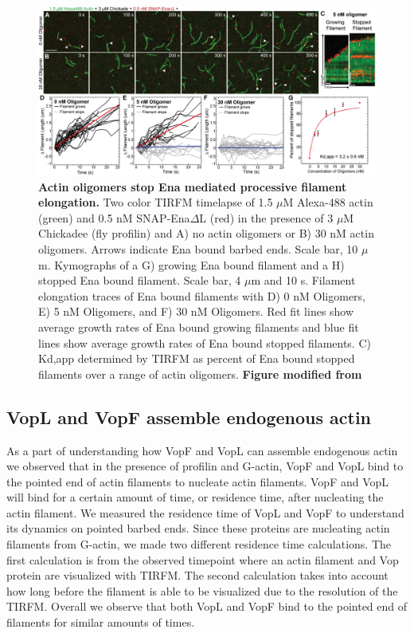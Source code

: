 \begin{figure}
\centering
\includegraphics[width=\textwidth]{img/ch04/Oligomer_Ena_Figure.jpg}
\caption[Actin oligomers stop Ena mediated processive filament elongation.]{\textbf{Actin oligomers stop Ena mediated processive filament elongation.} Two color TIRFM timelapse of 1.5 $\mu$M Alexa-488 actin (green) and 0.5 nM SNAP-Ena$\Delta$L (red) in the presence of 3 $\mu$M Chickadee (fly profilin) and A) no actin oligomers or B) 30 nM actin oligomers. Arrows indicate Ena bound barbed ends. Scale bar, 10 $\mu$m. Kymographs of a G) growing Ena bound filament and a H) stopped Ena bound filament. Scale bar, 4 $\mu$m and 10 s. Filament elongation traces of Ena bound filaments with D) 0 nM Oligomers, E) 5 nM Oligomers, and F) 30 nM Oligomers. Red fit lines show average growth rates of Ena bound growing filaments and blue fit lines show average growth rates of Ena bound stopped filaments. C) Kd,app determined by TIRFM as percent of Ena bound stopped filaments over a range of actin oligomers. \textbf{Figure modified from \citep{kudryashova_actin_2018}}}
\label{fig:ena-oligomers}
\end{figure}

\subsection{VopL and VopF assemble endogenous actin}\label{vops}

As a part of understanding how VopF and VopL can assemble endogenous actin we observed that in the presence of profilin and G-actin, VopF and VopL bind to the pointed end of actin filaments to nucleate actin filaments. VopF and VopL will bind for a certain amount of time, or residence time, after nucleating the actin filament. We measured the residence time of VopL and VopF to understand its dynamics on pointed barbed ends. Since these proteins are nucleating actin filaments from G-actin, we made two different residence time calculations. The first calculation is from the observed timepoint where an actin filament and Vop protein are visualized with TIRFM. The second calculation takes into account how long before the filament is able to be visualized due to the resolution of the TIRFM. Overall we observe that both VopL and VopF bind to the pointed end of filaments for similar amounts of times. 

